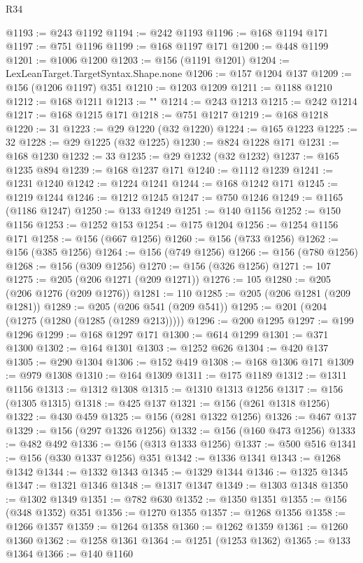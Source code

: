 \begin{lexlean}{R34}
\begin{coremodule}
{@1193 := @243 @1192
@1194 := @242 @1193
@1196 := @168 @1194 @171
@1197 := @751 @1196
@1199 := @168 @1197 @171
@1200 := @448 @1199
@1201 := @1006 @1200
@1203 := @156 (@1191 @1201)
@1204 := LexLeanTarget.TargetSyntax.Shape.none
@1206 := @157 @1204 @137
@1209 := @156 (@1206 @1197) @351
@1210 := @1203 @1209
@1211 := @1188 @1210
@1212 := @168 @1211
@1213 := "}"
@1214 := @243 @1213
@1215 := @242 @1214
@1217 := @168 @1215 @171
@1218 := @751 @1217
@1219 := @168 @1218
@1220 := 31
@1223 := @29 @1220 (@32 @1220)
@1224 := @165 @1223
@1225 := 32
@1228 := @29 @1225 (@32 @1225)
@1230 := @824 @1228 @171
@1231 := @168 @1230
@1232 := 33
@1235 := @29 @1232 (@32 @1232)
@1237 := @165 @1235 @894
@1239 := @168 @1237 @171
@1240 := @1112 @1239
@1241 := @1231 @1240
@1242 := @1224 @1241
@1244 := @168 @1242 @171
@1245 := @1219 @1244
@1246 := @1212 @1245
@1247 := @750 @1246
@1249 := @1165 (@1186 @1247)
@1250 := @133 @1249
@1251 := @140 @1156
@1252 := @150 @1156
@1253 := @1252 @153
@1254 := @175 @1204
@1256 := @1254 @1156 @171
@1258 := @156 (@667 @1256)
@1260 := @156 (@733 @1256)
@1262 := @156 (@385 @1256)
@1264 := @156 (@749 @1256)
@1266 := @156 (@780 @1256)
@1268 := @156 (@309 @1256)
@1270 := @156 (@326 @1256)
@1271 := 107
@1275 := @205 (@206 @1271 (@209 @1271))
@1276 := 105
@1280 := @205 (@206 @1276 (@209 @1276))
@1281 := 110
@1285 := @205 (@206 @1281 (@209 @1281))
@1289 := @205 (@206 @541 (@209 @541))
@1295 := @201 (@204 (@1275 (@1280 (@1285 (@1289 @213)))))
@1296 := @200 @1295
@1297 := @199 @1296
@1299 := @168 @1297 @171
@1300 := @614 @1299
@1301 := @371 @1300
@1302 := @164 @1301
@1303 := @1252 @626
@1304 := @420 @137
@1305 := @290 @1304
@1306 := @152 @419
@1308 := @168 @1306 @171
@1309 := @979 @1308
@1310 := @164 @1309
@1311 := @175 @1189
@1312 := @1311 @1156
@1313 := @1312 @1308
@1315 := @1310 @1313 @1256
@1317 := @156 (@1305 @1315)
@1318 := @425 @137
@1321 := @156 (@261 @1318 @1256)
@1322 := @430 @459
@1325 := @156 (@281 @1322 @1256)
@1326 := @467 @137
@1329 := @156 (@297 @1326 @1256)
@1332 := @156 (@160 @473 @1256)
@1333 := @482 @492
@1336 := @156 (@313 @1333 @1256)
@1337 := @500 @516
@1341 := @156 (@330 @1337 @1256) @351
@1342 := @1336 @1341
@1343 := @1268 @1342
@1344 := @1332 @1343
@1345 := @1329 @1344
@1346 := @1325 @1345
@1347 := @1321 @1346
@1348 := @1317 @1347
@1349 := @1303 @1348
@1350 := @1302 @1349
@1351 := @782 @630
@1352 := @1350 @1351
@1355 := @156 (@348 @1352) @351
@1356 := @1270 @1355
@1357 := @1268 @1356
@1358 := @1266 @1357
@1359 := @1264 @1358
@1360 := @1262 @1359
@1361 := @1260 @1360
@1362 := @1258 @1361
@1364 := @1251 (@1253 @1362)
@1365 := @133 @1364
@1366 := @140 @1160

\end{coremodule}
\end{lexlean}
